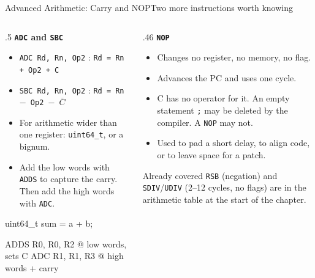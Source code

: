 \documentclass[9pt,aspectratio=169,xcolor=table]{beamer}
\begin{document}
\begin{frame}[fragile]{Advanced Arithmetic: Carry and NOP}{Two more instructions worth knowing}
    \begin{columns}[T]
    \begin{column}{.5\textwidth}
        \textbf{\texttt{ADC} and \texttt{SBC}}
        {\small
        \begin{itemize}\itemsep1pt
            \item \texttt{ADC Rd, Rn, Op2} : \texttt{Rd = Rn + Op2 + C}
            \item \texttt{SBC Rd, Rn, Op2} : \texttt{Rd = Rn $-$ Op2 $-$ $\overline{C}$}
            \item For arithmetic \alert{wider than one register}: \texttt{uint64\_t}, or a bignum.
            \item Add the low words with \texttt{ADDS} to capture the carry. Then add the high words with \texttt{ADC}.
        \end{itemize}}

        \vspace{2mm}
\begin{cc}[basicstyle=\ttfamily\footnotesize]
uint64_t sum = a + b;
\end{cc}
\begin{asm}[basicstyle=\ttfamily\footnotesize]
ADDS  R0, R0, R2  @ low words, sets C
ADC   R1, R1, R3  @ high words + carry
\end{asm}
    \end{column}
    \begin{column}{.46\textwidth}
        \textbf{\texttt{NOP}}
        {\small
        \begin{itemize}\itemsep1pt
            \item Changes no register, no memory, no flag.
            \item Advances the PC and uses one cycle.
            \item C has no operator for it. An empty statement \texttt{;} may be deleted by the compiler. A \texttt{NOP} may not.
            \item Used to pad a short delay, to align code, or to leave space for a patch.
        \end{itemize}}

        \vspace{2mm}
        \begin{block}{Already covered}
            \texttt{RSB} (negation) and \texttt{SDIV}/\texttt{UDIV} (2--12 cycles, no flags) are in the arithmetic table at the start of the chapter.
        \end{block}
    \end{column}
    \end{columns}
\end{frame}
\end{document}
